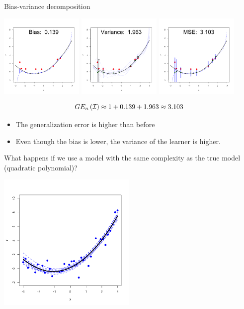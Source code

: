 \documentclass[11pt,compress,t,notes=noshow, xcolor=table]{beamer}
\begin{document}
\begin{vbframe} {Bias-variance decomposition}
\begin{center}
  \includegraphics[width = 0.3\textwidth]{figure/bias_variance_decomposition-complex_model_bias.png}
  \includegraphics[width = 0.3\textwidth]{figure/bias_variance_decomposition-complex_model_variance.png}
  \includegraphics[width = 0.3\textwidth]{figure/bias_variance_decomposition-complex_model_mse.png}
\end{center}

$$GE_n\left(\mathcal{I}\right) \approx 1 + 0.139 + 1.963 \approx 3.103 $$

\begin{itemize}
  \item The generalization error is higher than before
  \item Even though the bias is lower, the variance of the learner is higher. 
\end{itemize}



\framebreak

What happens if we use a model with the same complexity as the true model (quadratic polynomial)? 

\begin{center}
  \includegraphics[width = 0.5\textwidth]{figure/bias_variance_decomposition-correct_model.png}
\end{center}


\end{vbframe}
\end{document}
